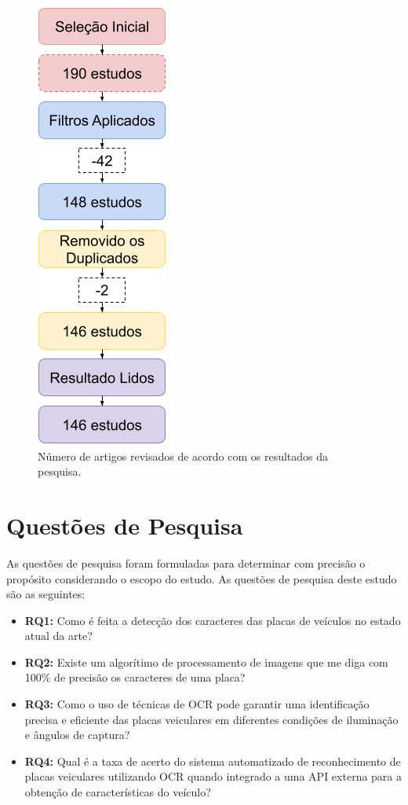 \documentclass[conference]{IEEEtran}
\begin{document}
\begin{figure}[htbp]
	\centerline{\includegraphics{img3.png}}
	\caption{Número de artigos revisados de acordo com os resultados da pesquisa.}
	\label{img3}
\end{figure}

\section{Questões de Pesquisa}

As questões de pesquisa foram formuladas para determinar com precisão o propósito considerando o escopo do estudo. As questões de pesquisa deste estudo são as seguintes:

\begin{itemize}
	\item \textbf{RQ1:} Como é feita a detecção dos caracteres das placas de veículos no estado atual da arte?
	\item \textbf{RQ2:} Existe um algorítimo de processamento de imagens que me diga com 100\% de precisão os caracteres de uma placa?
	\item \textbf{RQ3:} Como o uso de técnicas de OCR pode garantir uma identificação precisa e eficiente das placas veiculares em diferentes condições de iluminação e ângulos de captura?
	\item \textbf{RQ4:} Qual é a taxa de acerto do sistema automatizado de reconhecimento de placas veiculares utilizando OCR quando integrado a uma API externa para a obtenção de características do veículo?
\end{itemize}
\end{document}
